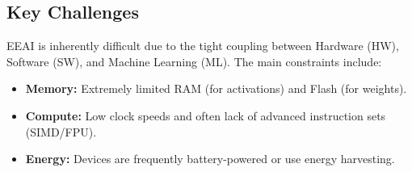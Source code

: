 \subsection{Key Challenges}
EEAI is inherently difficult due to the tight coupling between Hardware (HW), Software (SW), and Machine Learning (ML). The main constraints include:
\begin{itemize}
    \item \textbf{Memory:} Extremely limited RAM (for activations) and Flash (for weights).
    \item \textbf{Compute:} Low clock speeds and often lack of advanced instruction sets (SIMD/FPU).
    \item \textbf{Energy:} Devices are frequently battery-powered or use energy harvesting.
\end{itemize}
